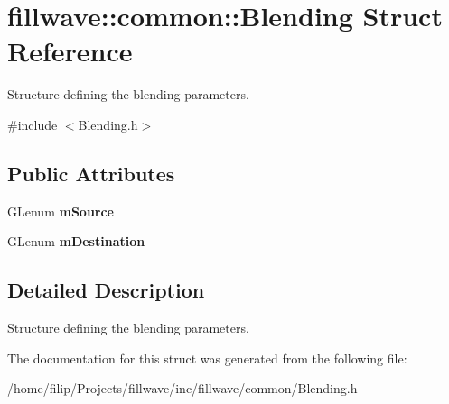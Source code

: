 \hypertarget{structfillwave_1_1common_1_1Blending}{}\section{fillwave\+:\+:common\+:\+:Blending Struct Reference}
\label{structfillwave_1_1common_1_1Blending}


Structure defining the blending parameters.  




{\ttfamily \#include $<$Blending.\+h$>$}

\subsection*{Public Attributes}
\begin{DoxyCompactItemize}
\item 
\hypertarget{structfillwave_1_1common_1_1Blending_a21824cba12a0d7d5ff66547e798cbbb3}{}G\+Lenum {\bfseries m\+Source}\label{structfillwave_1_1common_1_1Blending_a21824cba12a0d7d5ff66547e798cbbb3}

\item 
\hypertarget{structfillwave_1_1common_1_1Blending_a6364d3c3d2308c55cda6ba52e189f848}{}G\+Lenum {\bfseries m\+Destination}\label{structfillwave_1_1common_1_1Blending_a6364d3c3d2308c55cda6ba52e189f848}

\end{DoxyCompactItemize}


\subsection{Detailed Description}
Structure defining the blending parameters. 

The documentation for this struct was generated from the following file\+:\begin{DoxyCompactItemize}
\item 
/home/filip/\+Projects/fillwave/inc/fillwave/common/Blending.\+h\end{DoxyCompactItemize}
